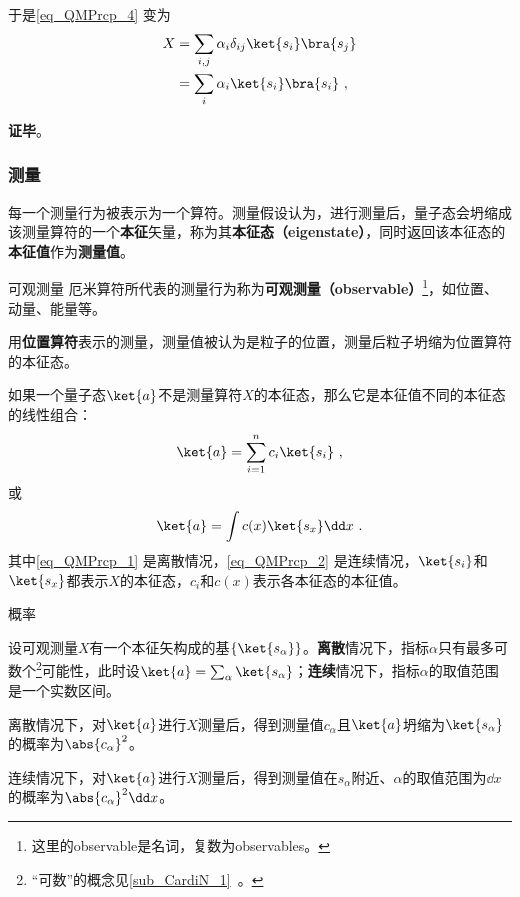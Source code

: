 于是\autoref{eq_QMPrcp_4} 变为
\begin{equation}
\begin{aligned}
X&=\sum_{i, j}\alpha_i\delta_{ij}\ket{s_i}\bra{s_j}\\
&=\sum_i\alpha_i\ket{s_i}\bra{s_i}~,
\end{aligned}
\end{equation}



\textbf{证毕}。



















\subsubsection{测量}

每一个测量行为被表示为一个算符。测量假设认为，进行测量后，量子态会坍缩成该测量算符的一个\textbf{本征}矢量，称为其\textbf{本征态（eigenstate）}，同时返回该本征态的\textbf{本征值}作为\textbf{测量值}。


\begin{definition}{可观测量}\label{def_QMPrcp_14}
厄米算符所代表的测量行为称为\textbf{可观测量（observable）}\footnote{这里的observable是名词，复数为observables。}，如位置、动量、能量等。
\end{definition}


\begin{example}{}
用\textbf{位置算符}表示的测量，测量值被认为是粒子的位置，测量后粒子坍缩为位置算符的本征态。
\end{example}

如果一个量子态$\ket{a}$不是测量算符$X$的本征态，那么它是本征值不同的本征态的线性组合：
\begin{equation}\label{eq_QMPrcp_1}
\ket{a} = \sum_{i=1}^{n} c_i\ket{s_i}~,
\end{equation}
或
\begin{equation}\label{eq_QMPrcp_2}
\ket{a} = \int c(x)\ket{s_x}\dd x~.
\end{equation}
其中\autoref{eq_QMPrcp_1} 是离散情况，\autoref{eq_QMPrcp_2} 是连续情况，$\ket{s_i}$和$\ket{s_x}$都表示$X$的本征态，$c_i$和$c(x)$表示各本征态的本征值。

\begin{definition}{概率}\label{def_QMPrcp_15}

设可观测量$X$有一个本征矢构成的基$\{\ket{s_\alpha}\}$。\textbf{离散}情况下，指标$\alpha$只有最多可数个\footnote{“可数”的概念见\autoref{sub_CardiN_1}~。}可能性，此时设$\ket{a}=\sum_{\alpha}\ket{s_\alpha}$；\textbf{连续}情况下，指标$\alpha$的取值范围是一个实数区间。

离散情况下，对$\ket{a}$进行$X$测量后，得到测量值$c_\alpha$且$\ket{a}$坍缩为$\ket{s_\alpha}$的概率为$\abs{c_\alpha}^2$。

连续情况下，对$\ket{a}$进行$X$测量后，得到测量值在$s_{\alpha}$附近、$\alpha$的取值范围为$\dd x$的概率为$\abs{c_\alpha}^2\dd x$。
\end{definition}


